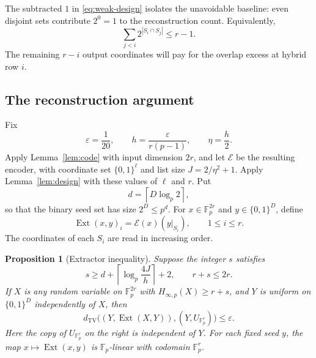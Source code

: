 \documentclass[11pt]{article}
\numberwithin{equation}{section}
\newtheorem{proposition}[theorem]{Proposition}
\theoremstyle{definition}
\theoremstyle{remark}
\newcommand{\F}{\mathbb F}
\newcommand{\TV}{d_{\mathrm{TV}}}
\newcommand{\Ext}{\operatorname{Ext}}
\begin{document}
The subtracted $1$ in \eqref{eq:weak-design} isolates the unavoidable
baseline: even disjoint sets contribute $2^0=1$ to the reconstruction
count.  Equivalently,
\[
 \sum_{j<i}2^{|S_i\cap S_j|}\le r-1.
\]
The remaining $r-i$ output coordinates will pay for the overlap excess at
hybrid row $i$.

\subsection{The reconstruction argument}

Fix
\begin{equation}\label{eq:eps-h-eta}
 \varepsilon=\frac1{20},\qquad
 h=\frac{\varepsilon}{r(p-1)},\qquad
 \eta=\frac h2.
\end{equation}
Apply Lemma~\ref{lem:code} with input dimension $2r$, and let
$\mathcal E$ be the resulting encoder, with coordinate set $\{0,1\}^\ell$
and list size $J=2/\eta^2+1$.  Apply Lemma~\ref{lem:design} with these
values of $\ell$ and $r$.
Put
\[
 d=\left\lceil D\log_p2\right\rceil,
\]
so that the binary seed set has size $2^D\le p^d$.  For
$x\in\F_p^{2r}$ and $y\in\{0,1\}^D$, define
\begin{equation}\label{eq:ext-definition}
 \Ext(x,y)_i=\mathcal E(x)(y|_{S_i}),
 \qquad 1\le i\le r.
\end{equation}
The coordinates of each $S_i$ are read in increasing order.

\begin{proposition}[Extractor inequality]\label{prop:extractor}
Suppose the integer $s$ satisfies
\begin{equation}\label{eq:s-threshold}
 s\ge d+\left\lceil\log_p\frac{4J}{h}\right\rceil+2,
 \qquad r+s\le2r.
\end{equation}
If $X$ is any random variable on $\F_p^{2r}$ with
$H_{\infty,p}(X)\ge r+s$, and $Y$ is uniform on $\{0,1\}^D$ independently
of $X$, then
\begin{equation}\label{eq:strong-ext}
 \TV\bigl((Y,\Ext(X,Y)),(Y,U_{\F_p^r})\bigr)\le\varepsilon.
\end{equation}
Here the copy of $U_{\F_p^r}$ on the right is independent of $Y$.
For each fixed seed $y$, the map $x\mapsto\Ext(x,y)$ is
$\F_p$-linear with codomain $\F_p^r$.
\end{proposition}
\end{document}
